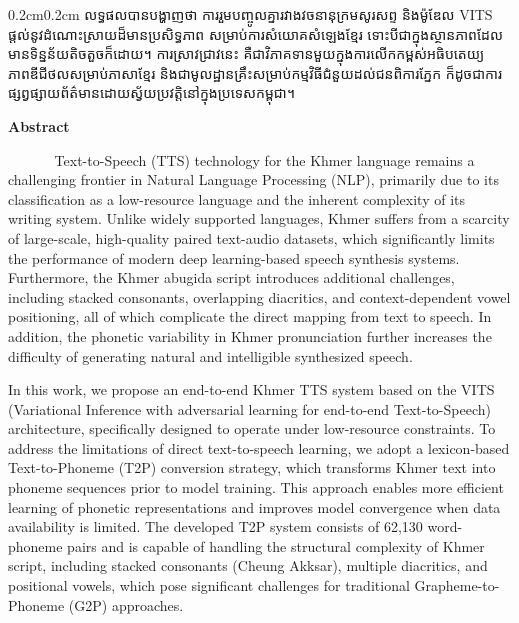 \begin{adjustwidth}{0.2cm}{0.2cm}
    លទ្ធផលបានបង្ហាញថា 
    ការរួមបញ្ចូលគ្នារវាងវចនានុក្រមសូរសព្ទ 
    និងម៉ូឌែល 
    {\englishfont\fontsize{13.5pt}{20pt}\selectfont VITS} 
    ផ្ដល់នូវដំណោះស្រាយដ៏មានប្រសិទ្ធភាព 
    សម្រាប់ការសំយោគសំឡេងខ្មែរ 
    ទោះបីជាក្នុងស្ថានភាពដែលមានទិន្នន័យតិចតួចក៏ដោយ។ 
    ការស្រាវជ្រាវនេះ 
    គឺជាវិភាគទានមួយក្នុងការលើកកម្ពស់អធិបតេយ្យភាពឌីជីថលសម្រាប់ភាសាខ្មែរ 
    និងជាមូលដ្ឋានគ្រឹះសម្រាប់កម្មវិធីជំនួយដល់ជនពិការភ្នែក 
    ក៏ដូចជាការផ្សព្វផ្សាយព័ត៌មានដោយស្វ័យប្រវត្តិនៅក្នុងប្រទេសកម្ពុជា។
    \vspace{2cm}
    
    \clearpage
    \begin{center}
        {\bfseries\large Abstract}
    \end{center}

    \vspace{-0.2cm}
    \setlength{\parindent}{0pt}
    \vspace{0.3cm}


    \label{abstract}
    \englishfont\fontsize{13.5pt}{17pt}\selectfont 
    ​ ​ ​ ​ ​ ​ ​​ ​ ​ ​  Text-to-Speech (TTS) technology for the Khmer language 
    remains a challenging frontier in Natural Language Processing (NLP), 
    primarily due to its classification as a low-resource language and the 
    inherent complexity of its writing system. Unlike widely supported 
    languages, Khmer suffers from a scarcity of large-scale, high-quality 
    paired text-audio datasets, which significantly limits the performance 
    of modern deep learning-based speech synthesis systems. Furthermore, 
    the Khmer abugida script introduces additional challenges, including 
    stacked consonants, overlapping diacritics, and context-dependent vowel 
    positioning, all of which complicate the direct mapping from text to 
    speech. In addition, the phonetic variability in Khmer pronunciation 
    further increases the difficulty of generating natural and intelligible 
    synthesized speech.
    
    In this work, we propose an end-to-end Khmer TTS system based on the 
    VITS (Variational Inference with adversarial learning for end-to-end 
    Text-to-Speech) architecture, specifically designed to operate under 
    low-resource constraints. To address the limitations of direct 
    text-to-speech learning, we adopt a lexicon-based Text-to-Phoneme (T2P) 
    conversion strategy, which transforms Khmer text into phoneme sequences 
    prior to model training. This approach enables more efficient learning 
    of phonetic representations and improves model convergence when data 
    availability is limited. The developed T2P system consists of 62,130 
    word-phoneme pairs and is capable of handling the structural complexity 
    of Khmer script, including stacked consonants (Cheung Akksar), multiple 
    diacritics, and positional vowels, which pose significant challenges 
    for traditional Grapheme-to-Phoneme (G2P) approaches.
    

\end{adjustwidth}
